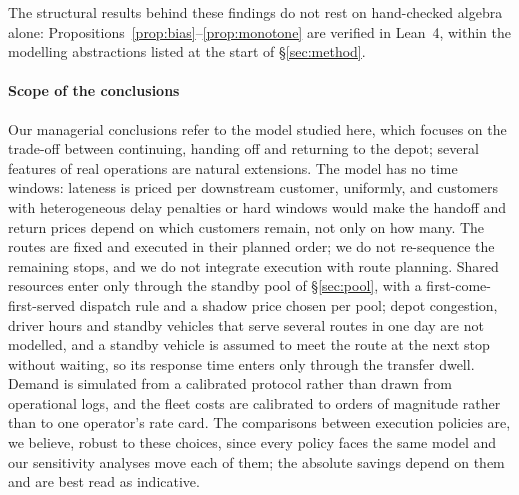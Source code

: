 \documentclass[preprint,authoryear,12pt]{elsarticle}
\theoremstyle{definition}
\theoremstyle{remark}
\begin{document}
The structural results behind these findings do not rest on
hand-checked algebra alone: Propositions~\ref{prop:bias}--\ref{prop:monotone}
are verified in Lean~4, within the modelling abstractions listed at the
start of \S\ref{sec:method}.

\paragraph{Scope of the conclusions} Our managerial conclusions refer
to the model studied here, which focuses on the trade-off between
continuing, handing off and returning to the depot; several features of
real operations are natural extensions. The model has no time windows: lateness is priced per
downstream customer, uniformly, and customers with heterogeneous delay
penalties or hard windows would make the handoff and return prices
depend on which customers remain, not only on how many. The routes are
fixed and executed in their planned order; we do not re-sequence the
remaining stops, and we do not integrate execution with route planning.
Shared resources enter only through the standby pool of
\S\ref{sec:pool}, with a first-come-first-served dispatch rule and a
shadow price chosen per pool; depot congestion, driver hours and
standby vehicles that serve several routes in one day are not modelled,
and a standby vehicle is assumed to meet the route at the next stop
without waiting, so its response time enters only through the transfer
dwell.
Demand is simulated from a calibrated protocol rather than drawn from
operational logs, and the fleet costs are calibrated to orders of
magnitude rather than to one operator's rate card. The comparisons
between execution policies are, we believe, robust to these choices,
since every policy faces the same model and our sensitivity analyses
move each of them; the absolute savings depend on them and are best read as
indicative.
\end{document}
